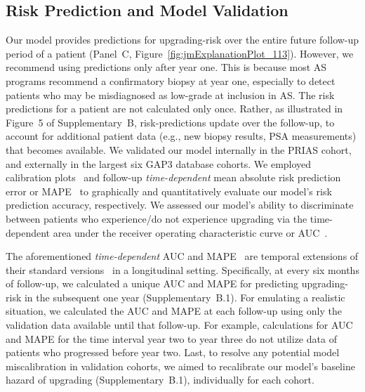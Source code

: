 \subsection{Risk Prediction and Model Validation}
Our model provides predictions for upgrading-risk over the entire future follow-up period of a patient (Panel~C, Figure~\ref{fig:jmExplanationPlot_113}). However, we recommend using predictions only after year one. This is because most AS programs recommend a confirmatory biopsy at year one, especially to detect patients who may be misdiagnosed as low-grade at inclusion in AS. The risk predictions for a patient are not calculated only once. Rather, as illustrated in Figure~5 of Supplementary~B, risk-predictions update over the follow-up, to account for additional patient data (e.g., new biopsy results, PSA measurements) that becomes available. We validated our model internally in the PRIAS cohort, and externally in the largest six GAP3 database cohorts. We employed calibration plots~\citep{royston2013external,steyerberg2010assessing} and follow-up \textit{time-dependent} mean absolute risk prediction error or MAPE~\citep{rizopoulos2017dynamic} to graphically and quantitatively evaluate our model's risk prediction accuracy, respectively. We assessed our model's ability to discriminate between patients who experience/do not experience upgrading via the time-dependent area under the receiver operating characteristic curve or AUC~\citep{rizopoulos2017dynamic}. 

The aforementioned \textit{time-dependent} AUC and MAPE~\citep{rizopoulos2017dynamic} are temporal extensions of their standard versions~\citep{steyerberg2010assessing} in a longitudinal setting. Specifically, at every six months of follow-up, we calculated a unique AUC and MAPE for predicting upgrading-risk in the subsequent one year (Supplementary~B.1). For emulating a realistic situation, we calculated the AUC and MAPE at each follow-up using only the validation data available until that follow-up. For example, calculations for AUC and MAPE for the time interval year two to year three do not utilize data of patients who progressed before year two. Last, to resolve any potential model miscalibration in validation cohorts, we aimed to recalibrate our model's baseline hazard of upgrading (Supplementary~B.1), individually for each cohort.